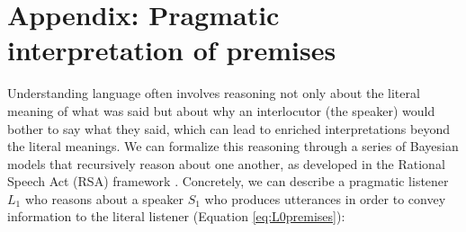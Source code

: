 \documentclass[floatsintext, doc]{apa6}
\begin{document}
%
%
%
%



\newpage




\newpage 

\appendix

\section{Appendix: Pragmatic interpretation of premises}


Understanding language often involves reasoning not only about the literal meaning of what was said but about why an interlocutor (the speaker) would bother to say what they said, which can lead to enriched interpretations beyond the literal meanings. 
We can formalize this reasoning through a series of Bayesian models that recursively reason about one another, as developed in the Rational Speech Act (RSA) framework \cite{Frank2012a, goodman2016pragmatic, scontras2018probabilistic}.
Concretely, we can describe a pragmatic listener $L_1$ who reasons about a speaker $S_1$ who produces utterances in order to convey information to the literal listener (Equation \ref{eq:L0premises}):
\end{document}
